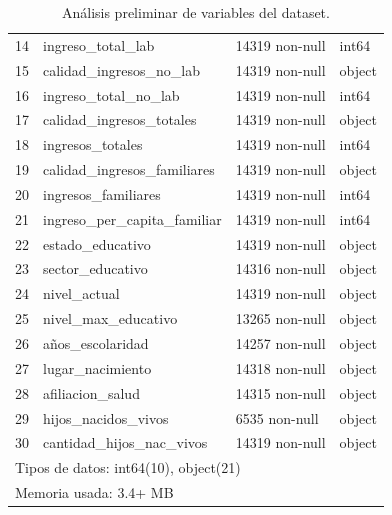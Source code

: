 \documentclass[a4paper]{article}
\begin{document}
\begin{table}[H]
\begin{center}
\begin{tabular}{clll}
    14 & ingreso\_total\_lab           & 14319 non-null & int64  \\
    15 & calidad\_ingresos\_no\_lab     & 14319 non-null & object \\
    16 & ingreso\_total\_no\_lab        & 14319 non-null & int64  \\
    17 & calidad\_ingresos\_totales    & 14319 non-null & object \\
    18 & ingresos\_totales            & 14319 non-null & int64  \\
    19 & calidad\_ingresos\_familiares & 14319 non-null & object \\
    20 & ingresos\_familiares         & 14319 non-null & int64  \\
    21 & ingreso\_per\_capita\_familiar & 14319 non-null & int64  \\
    22 & estado\_educativo            & 14319 non-null & object \\
    23 & sector\_educativo            & 14316 non-null & object \\
    24 & nivel\_actual                & 14319 non-null & object \\
    25 & nivel\_max\_educativo         & 13265 non-null & object \\
    26 & años\_escolaridad            & 14257 non-null & object \\
    27 & lugar\_nacimiento            & 14318 non-null & object \\
    28 & afiliacion\_salud            & 14315 non-null & object \\
    29 & hijos\_nacidos\_vivos         & 6535 non-null  & object \\
    30 & cantidad\_hijos\_nac\_vivos    & 14319 non-null & object \\
    \bottomrule
    \multicolumn{4}{l}{Tipos de datos: int64(10), object(21)}  \\
    \multicolumn{4}{l}{Memoria usada: 3.4+ MB} \\
    \end{tabular}\end{center}
    \caption{Análisis preliminar de variables del dataset.}
    \label{Preliminar dataset analysis}
    \end{table}
       
\end{document}
